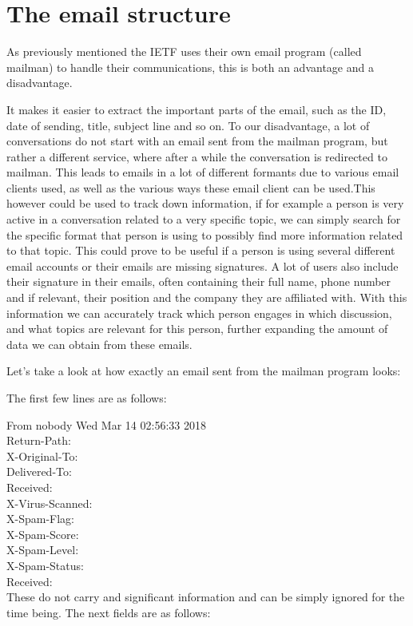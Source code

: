 \documentclass{report}
\begin{document}
\section{The email structure}
As previously mentioned the IETF uses their own email program (called mailman) to handle their communications, this is both an advantage and a disadvantage.

It makes it easier to extract the important parts of the email, such as the ID, date of sending, title, subject line and so on. To our disadvantage, a lot of conversations do not start with an email sent from the mailman program, but rather a different service, where after a while the conversation is redirected to mailman. This leads to emails in a lot of different formants due to various email clients used, as well as the various ways these email client can be used.This however could be used to track down information, if for example a person is very active in a conversation related to a very specific topic, we can simply search for the specific format that person is using to possibly find more information related to that topic. This could prove to be useful if a person is using several different email accounts or their emails are missing signatures.
A lot of users also include their signature in their emails, often containing their full name, phone number and if relevant, their position and the company they are affiliated with. With this information we can accurately track which person engages in which discussion, and what topics are relevant for this person, further expanding the amount of data we can obtain from these emails.

Let's take a look at how exactly an email sent from the mailman program looks:


The first few lines are as follows:

From nobody Wed Mar 14 02:56:33 2018\\
Return-Path: \\
X-Original-To:\\
Delivered-To: \\
Received: \\
X-Virus-Scanned: \\
X-Spam-Flag: \\
X-Spam-Score: \\
X-Spam-Level: \\
X-Spam-Status: \\
Received: \\

These do not carry and significant information and can be simply ignored for the time being. The next fields are as follows:
\end{document}
